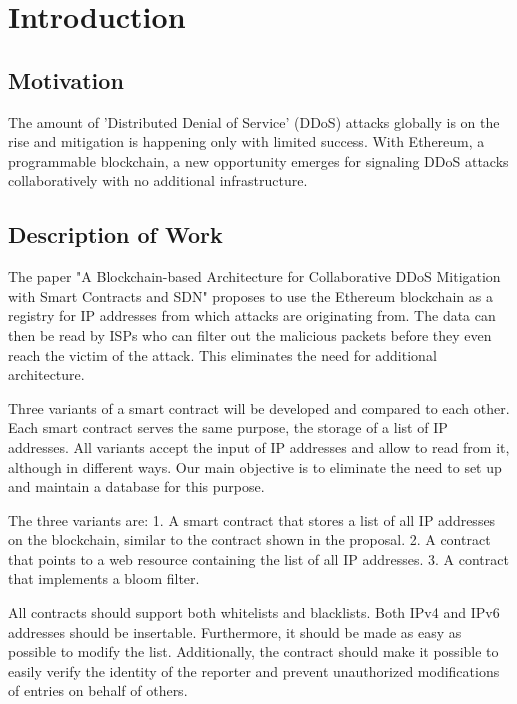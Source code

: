 \chapter{Introduction}

\section{Motivation}

The amount of 'Distributed Denial of Service' (DDoS) attacks globally is on the rise \cite{DDoSRise} and mitigation is happening only with limited success. With Ethereum, a programmable blockchain, a new opportunity emerges for signaling DDoS attacks collaboratively with no additional infrastructure. 

\section{Description of Work}

The paper {"}A Blockchain-based Architecture for Collaborative DDoS Mitigation with Smart Contracts and SDN{"} \cite{OriginalPaper} proposes to use the Ethereum blockchain as a registry for IP addresses from which attacks are originating from. The data can then be read by ISPs who can filter out the malicious packets before they even reach the victim of the attack. This eliminates the need for additional architecture.

Three variants of a smart contract will be developed and compared to each other. Each smart contract serves the same purpose, the storage of a list of IP addresses. All variants accept the input of IP addresses and allow to read from it, although in different ways.
Our main objective is to eliminate the need to set up and maintain a database for this purpose.

The three variants are: 1. A smart contract that stores a list of all IP addresses on the blockchain, similar to the contract shown in the proposal. 2. A contract that points to a web resource containing the list of all IP addresses. 3. A contract that implements a bloom filter.

All contracts should support both whitelists and blacklists. Both IPv4 and IPv6 addresses should be insertable. Furthermore, it should be made as easy as possible to modify the list. Additionally, the contract should make it possible to easily verify the identity of the reporter and prevent unauthorized modifications of entries on behalf of others. 

